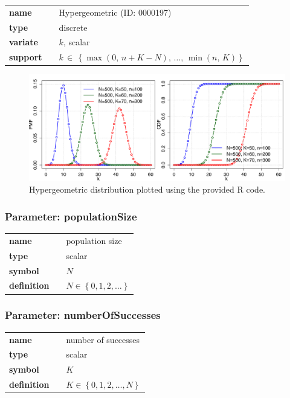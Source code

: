 \begin{tabular}{p{2cm}cl}
\textbf{name} & & Hypergeometric (ID: 0000197)\\ 
 
\textbf{type} & & discrete \\ 

\textbf{variate} & & $k$, scalar \\ 

\textbf{support} & & $k\, \in\, \left\{\max{(0,\, n+K-N)},\, \dots,\, \min{(n,\, K )}\right\}$
\end{tabular}

\begin{figure}[ht!]
\centering
  \includegraphics[width=140mm]{pics/Hypergeometric.pdf}
 \caption{Hypergeometric distribution plotted using the provided R code.}
 \label{fig:Hypergeometric}
\end{figure}

\subsubsection*{Parameter: populationSize}

\noindent\begin{tabular}{p{2cm}cl}
\textbf{name} & & population size \\
\textbf{type} & & scalar \\
\textbf{symbol} & & $N$  \\
\textbf{definition} & & $N \in \left\{0,1,2,\dots\right\}$
\end{tabular}
\subsubsection*{Parameter: numberOfSuccesses}

\noindent\begin{tabular}{p{2cm}cl}
\textbf{name} & & number of successes \\
\textbf{type} & & scalar \\
\textbf{symbol} & & $K$  \\
\textbf{definition} & & $K \in \left\{0,1,2,\dots,N\right\} $
\end{tabular}
